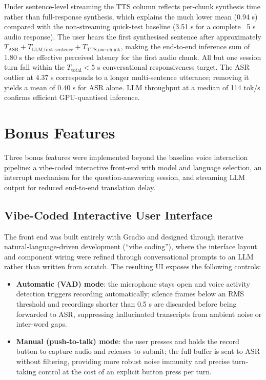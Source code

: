 \documentclass[12pt, a4paper]{article}
\begin{document}
Under sentence-level streaming the TTS column reflects per-chunk synthesis time rather than full-response synthesis, which explains the much lower mean (0.94 s) compared with the non-streaming quick-test baseline (3.51 s for a complete ~5 s audio response). The user hears the first synthesised sentence after approximately $T_{\text{ASR}} + T_{\text{LLM,first-sentence}} + T_{\text{TTS,one-chunk}}$, making the end-to-end inference sum of 1.80 s the effective perceived latency for the first audio chunk. All but one session turn fall within the $T_{\text{total}} < 5$ s conversational responsiveness target. The ASR outlier at 4.37 s corresponds to a longer multi-sentence utterance; removing it yields a mean of 0.40 s for ASR alone. LLM throughput at a median of 114 tok/s confirms efficient GPU-quantised inference.

\section{Bonus Features}
\label{sec:bonus}

Three bonus features were implemented beyond the baseline voice interaction pipeline: a vibe-coded interactive front-end with model and language selection, an interrupt mechanism for the question-answering session, and streaming LLM output for reduced end-to-end translation delay.

\subsection{Vibe-Coded Interactive User Interface}

The front end was built entirely with Gradio and designed through iterative natural-language-driven development (``vibe coding''), where the interface layout and component wiring were refined through conversational prompts to an LLM rather than written from scratch. The resulting UI exposes the following controls:

\begin{itemize}
    \item \textbf{Automatic (VAD) mode}: the microphone stays open and voice activity detection triggers recording automatically; silence frames below an RMS threshold and recordings shorter than 0.5 s are discarded before being forwarded to ASR, suppressing hallucinated transcripts from ambient noise or inter-word gaps.
    \item \textbf{Manual (push-to-talk) mode}: the user presses and holds the record button to capture audio and releases to submit; the full buffer is sent to ASR without filtering, providing more robust noise immunity and precise turn-taking control at the cost of an explicit button press per turn.
\end{itemize}
 
\end{document}
